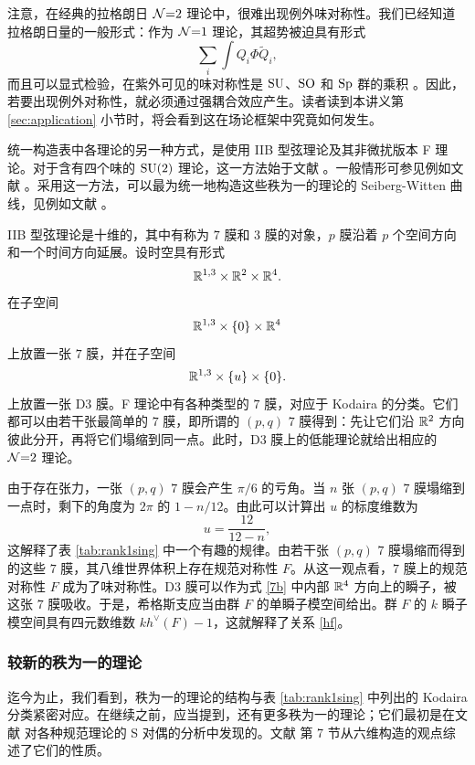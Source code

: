 注意，在经典的拉格朗日 $\mathcal{N}{=}2$ 理论中，很难出现例外味对称性。我们已经知道拉格朗日量的一般形式：作为 $\mathcal{N}{=}1$ 理论，其超势被迫具有形式
\begin{equation}
\sum_i\int Q_i\Phi\tilde Q_i,
\end{equation}
而且可以显式检验，在紫外可见的味对称性是 $\mathop{\mathrm{SU}}$、$\mathop{\mathrm{SO}}$ 和 $\mathop{\mathrm{Sp}}$ 群的乘积 \cite{McOrist:2013bga}。因此，若要出现例外对称性，就必须通过强耦合效应产生。读者读到本讲义第 \ref{sec:application} 小节时，将会看到这在场论框架中究竟如何发生。

统一构造表中各理论的另一种方式，是使用 IIB 型弦理论及其非微扰版本 F 理论。对于含有四个味的 $\mathop{\mathrm{SU}}(2)$ 理论，这一方法始于文献 \cite{Banks:1996nj}。一般情形可参见例如文献 \cite{DeWolfe:1998bi}。采用这一方法，可以最为统一地构造这些秩为一的理论的 Seiberg-Witten 曲线，见例如文献 \cite{Noguchi:1999xq}。

IIB 型弦理论是十维的，其中有称为 $7$ 膜和 $3$ 膜的对象，$p$ 膜沿着 $p$ 个空间方向和一个时间方向延展。设时空具有形式
\begin{equation}
\mathbb{R}^{1,3}\times\mathbb{R}^2\times\mathbb{R}^4.
\end{equation}
在子空间
\begin{equation}
\mathbb{R}^{1,3}\times\{0\}\times\mathbb{R}^4\label{7b}
\end{equation}
上放置一张 $7$ 膜，并在子空间
\begin{equation}
\mathbb{R}^{1,3}\times\{u\}\times\{0\}.
\end{equation}
上放置一张 D3 膜。F 理论中有各种类型的 $7$ 膜，对应于 Kodaira 的分类。它们都可以由若干张最简单的 $7$ 膜，即所谓的 $(p,q)$ $7$ 膜得到：先让它们沿 $\mathbb{R}^2$ 方向彼此分开，再将它们塌缩到同一点。此时，D3 膜上的低能理论就给出相应的 $\mathcal{N}{=}2$ 理论。

由于存在张力，一张 $(p,q)$ $7$ 膜会产生 $\pi/6$ 的亏角。当 $n$ 张 $(p,q)$ $7$ 膜塌缩到一点时，剩下的角度为 $2\pi$ 的 $1-n/12$。由此可以计算出 $u$ 的标度维数为
\begin{equation}
u=\frac{12}{12-n},
\end{equation}
这解释了表 \ref{tab:rank1sing} 中一个有趣的规律。由若干张 $(p,q)$ $7$ 膜塌缩而得到的这些 $7$ 膜，其八维世界体积上存在规范对称性 $F$。从这一观点看，$7$ 膜上的规范对称性 $F$ 成为了味对称性。D3 膜可以作为式 \eqref{7b} 中内部 $\mathbb{R}^4$ 方向上的瞬子，被这张 $7$ 膜吸收。于是，希格斯支应当由群 $F$ 的单瞬子模空间给出。群 $F$ 的 $k$ 瞬子模空间具有四元数维数 $kh^\vee(F)-1$，这就解释了关系 \eqref{hf}。

\subsubsection{较新的秩为一的理论}
迄今为止，我们看到，秩为一的理论的结构与表 \ref{tab:rank1sing} 中列出的 Kodaira 分类紧密对应。在继续之前，应当提到，还有更多秩为一的理论；它们最初是在文献 \cite{Argyres:2010py} 对各种规范理论的 S 对偶的分析中发现的。文献 \cite{Chacaltana:2012ch} 第 7 节从六维构造的观点综述了它们的性质。

